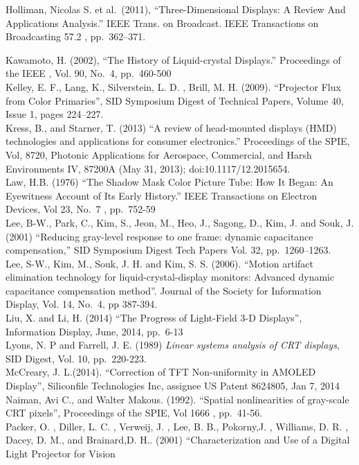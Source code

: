 \documentclass[
  letterpaper,
]{book}
\begin{document}
Holliman, Nicolas S. et al.~(2011), ``Three-Dimensional Displays: A
Review And Applications Analysis.'' IEEE Trans. on Broadcast. IEEE
Transactions on Broadcasting 57.2 , pp.~362--371.

Kawamoto, H. (2002), ``The History of Liquid-crystal Displays.''
Proceedings of the IEEE , Vol. 90, No.~4, pp.~460-500\\
Kelley, E. F., Lang, K., Silverstein, L. D. , Brill, M. H. (2009).
``Projector Flux from Color Primaries'', SID Symposium Digest of
Technical Papers, Volume 40, Issue 1, pages 224--227.\\
Kress, B., and Starner, T. (2013) ``A review of head-mounted displays
(HMD) technologies and applications for consumer electronics.''
Proceedings of the SPIE, Vol, 8720, Photonic Applications for Aerospace,
Commercial, and Harsh Environments IV, 87200A (May 31, 2013);
doi:10.1117/12.2015654.\\
Law, H.B. (1976) ``The Shadow Mask Color Picture Tube: How It Began: An
Eyewitness Account of Its Early History.'' IEEE Transactions on Electron
Devices, Vol 23, No.~7 , pp.~752-59\\
Lee, B-W., Park, C., Kim, S., Jeon, M., Heo, J., Sagong, D., Kim, J. and
Souk, J. (2001) ``Reducing gray-level response to one frame: dynamic
capacitance compensation,'' SID Symposium Digest Tech Papers Vol. 32,
pp.~1260--1263.\\
Lee, S-W., Kim, M., Souk, J. H. and Kim, S. S. (2006). ``Motion artifact
elimination technology for liquid-crystal-display monitors: Advanced
dynamic capacitance compensation method''. Journal of the Society for
Information Display, Vol. 14, No.~4, pp 387-394.\\
Liu, X. and Li, H. (2014) ``The Progress of Light-Field 3-D Displays'',
Information Display, June, 2014, pp.~6-13\\
Lyons, N. P and Farrell, J. E. (1989) \emph{Linear systems analysis of
CRT displays}, SID Digest, Vol. 10, pp.~220-223.\\
McCreary, J. L.(2014). ``Correction of TFT Non-uniformity in AMOLED
Display'', Siliconfile Technologies Inc, assignee US Patent 8624805, Jan
7, 2014\\
Naiman, Avi C., and Walter Makous. (1992). ``Spatial nonlinearities of
gray-scale CRT pixels'', Proceedings of the SPIE, Vol 1666 ,
pp.~41-56.\\
Packer, O. , Diller, L. C. , Verweij, J. , Lee, B. B., Pokorny,J. ,
Williams, D. R. , Dacey, D. M., and Brainard,D. H.. (2001)
``Characterization and Use of a Digital Light Projector for Vision
\end{document}
